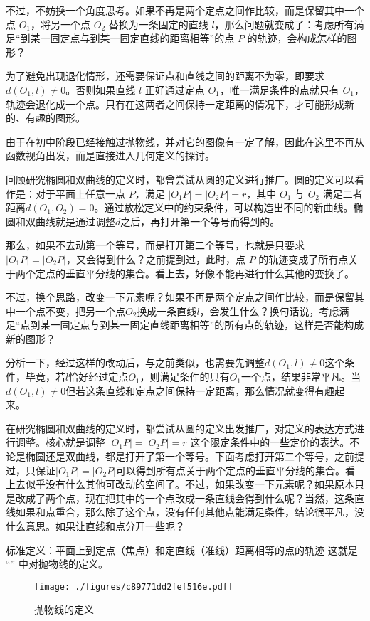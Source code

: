 不过，不妨换一个角度思考。如果不再是两个定点之间作比较，而是保留其中一个点 $O_1$，将另一个点 $O_2$ 替换为一条固定的直线 $l$，那么问题就变成了：考虑所有满足“到某一固定点与到某一固定直线的距离相等”的点 $P$ 的轨迹，会构成怎样的图形？

为了避免出现退化情形，还需要保证点和直线之间的距离不为零，即要求 $d(O_1,l)\ne 0$。否则如果直线 $l$ 正好通过定点 $O_1$，唯一满足条件的点就只有 $O_1$，轨迹会退化成一个点。只有在这两者之间保持一定距离的情况下，才可能形成新的、有趣的图形。


由于在初中阶段已经接触过抛物线，并对它的图像有一定了解，因此在这里不再从函数视角出发，而是直接进入几何定义的探讨。

回顾研究椭圆和双曲线的定义时，都曾尝试从圆的定义进行推广。圆的定义可以看作是：对于平面上任意一点 $P$，满足 $|O_1P| = |O_2P| = r$，其中 $O_1$ 与 $O_2$ 满足二者距离$d(O_1,O_2)=0$。通过放松定义中的约束条件，可以构造出不同的新曲线。椭圆和双曲线就是通过调整$d$之后，再打开第一个等号而得到的。

那么，如果不去动第一个等号，而是打开第二个等号，也就是只要求 $|O_1P| = |O_2P|$，又会得到什么？之前提到过，此时，点 $P$ 的轨迹变成了所有点关于两个定点的垂直平分线的集合。看上去，好像不能再进行什么其他的变换了。

不过，换个思路，改变一下元素呢？如果不再是两个定点之间作比较，而是保留其中一个点不变，把另一个点$O_2$换成一条直线$l$，会发生什么？换句话说，考虑满足“点到某一固定点与到某一固定直线距离相等”的所有点的轨迹，这样是否能构成新的图形？

分析一下，经过这样的改动后，与之前类似，也需要先调整$d(O_1,l)\neq0$这个条件，毕竟，若$l$恰好经过定点$O_1$，则满足条件的只有$O_1$一个点，结果非常平凡。当$d(O_1,l)\neq0$但若这条直线和定点之间保持一定距离，那么情况就变得有趣起来。


在研究椭圆和双曲线的定义时，都尝试从圆的定义出发推广，对定义的表达方式进行调整。核心就是调整 $|O_1P| = |O_2P| = r$ 这个限定条件中的一些定价的表达。不论是椭圆还是双曲线，都是打开了第一个等号。下面考虑打开第二个等号，之前提过，只保证$|O_1P| = |O_2P|$可以得到所有点关于两个定点的垂直平分线的集合。看上去似乎没有什么其他可改动的空间了。不过，如果改变一下元素呢？如果原本只是改成了两个点，现在把其中的一个点改成一条直线会得到什么呢？当然，这条直线如果和点重合，那么除了这个点，没有任何其他点能满足条件，结论很平凡，没什么意思。如果让直线和点分开一些呢？



标准定义：平面上到定点（焦点）和定直线（准线）距离相等的点的轨迹
这就是 “” 中对抛物线的定义。
\begin{figure}[ht]
\centering
\texttt{[image: ./figures/c89771dd2fef516e.pdf]}
\caption{抛物线的定义} \label{fig_Para3_1}
\end{figure}

